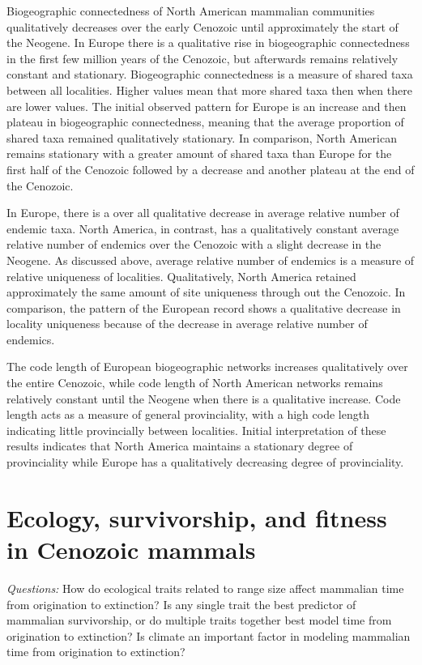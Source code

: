 \documentclass[12pt,letterpaper]{article}
\begin{document}
Biogeographic connectedness of North American mammalian communities qualitatively decreases over the early Cenozoic until approximately the start of the Neogene. In Europe there is a qualitative rise in biogeographic connectedness in the first few million years of the Cenozoic, but afterwards remains relatively constant and stationary. Biogeographic connectedness is a measure of shared taxa between all localities. Higher values mean that more shared taxa then when there are lower values. The initial observed pattern for Europe is an increase and then plateau in biogeographic connectedness, meaning that the average proportion of shared taxa remained qualitatively stationary. In comparison, North American remains stationary with a greater amount of shared taxa than Europe for the first half of the Cenozoic followed by a decrease and another plateau at the end of the Cenozoic.

In Europe, there is a over all qualitative decrease in average relative number of endemic taxa. North America, in contrast, has a qualitatively constant average relative number of endemics over the Cenozoic with a slight decrease in the Neogene. As discussed above, average relative number of endemics is a measure of relative uniqueness of localities. Qualitatively, North America retained approximately the same amount of site uniqueness through out the Cenozoic. In comparison, the pattern of the European record shows a qualitative decrease in locality uniqueness because of the decrease in average relative number of endemics.

The code length of European biogeographic networks increases qualitatively over the entire Cenozoic, while code length of North American networks remains relatively constant until the Neogene when there is a qualitative increase. Code length acts as a measure of general provinciality, with a high code length indicating little provincially between localities. Initial interpretation of these results indicates that North America maintains a stationary degree of provinciality while Europe has a qualitatively decreasing degree of provinciality. %


\section{Ecology, survivorship, and fitness in Cenozoic mammals}

\textit{Questions:} 
How do ecological traits related to range size affect mammalian time from origination to extinction? Is any single trait the best predictor of mammalian survivorship, or do multiple traits together best model time from origination to extinction? Is climate an important factor in modeling mammalian time from origination to extinction?
\end{document}
